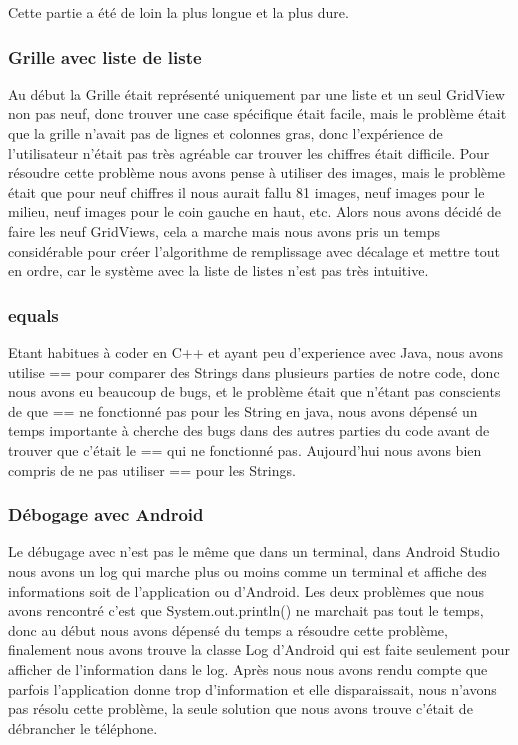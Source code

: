 \documentclass{article}
\begin{document}
Cette partie a été de loin la plus longue et la plus dure.

\subsubsection{Grille avec liste de liste}
Au début la Grille était représenté uniquement par une liste et un seul GridView non pas neuf, donc trouver une case spécifique était facile, mais le problème était que la grille n'avait pas de lignes et colonnes gras, donc l'expérience de l'utilisateur n'était pas très agréable car trouver les chiffres était difficile. Pour résoudre cette problème nous avons pense à utiliser des images, mais le problème était que pour neuf chiffres il nous aurait fallu 81 images, neuf images pour le milieu, neuf images pour le coin gauche en haut, etc. Alors nous avons décidé de faire les neuf GridViews, cela a marche mais nous avons pris un temps considérable pour créer l'algorithme de remplissage avec décalage et mettre tout en ordre, car le système avec la liste de listes n'est pas très intuitive.

\subsubsection{equals}
Etant habitues à coder en C++ et ayant peu d'experience avec Java, nous avons utilise == pour comparer des Strings dans plusieurs parties de notre code, donc nous avons eu beaucoup de bugs, et le problème était que n'étant pas conscients de que == ne fonctionné pas pour les String en java, nous avons dépensé un temps importante à cherche des bugs dans des autres parties du code avant de trouver que c'était le == qui ne fonctionné pas. Aujourd'hui nous avons bien compris de ne pas utiliser == pour les Strings. 

\subsubsection{Débogage avec Android}
Le débugage avec n'est pas le même que dans un terminal, dans Android Studio nous avons un log qui marche plus ou moins comme un terminal et affiche des informations soit de l'application ou d'Android. Les deux problèmes que nous avons rencontré c'est que System.out.println() ne marchait pas tout le temps, donc au début nous avons dépensé du temps a résoudre cette problème, finalement nous avons trouve la classe Log d'Android qui est faite seulement pour afficher de l'information dans le log. Après nous nous avons rendu compte que parfois l'application donne trop d'information et elle disparaissait, nous n'avons pas résolu cette problème, la seule solution que nous avons trouve c'était de débrancher le téléphone.
\end{document}
